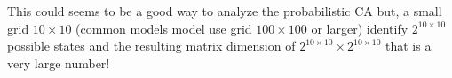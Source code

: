 This could seems to be a good way to analyze the probabilistic CA but, a
small grid  \begin{math}10\times10\end{math} (common models model use grid
\begin{math}100\times100\end{math} or larger) identify
\begin{math}2^{10\times10}\end{math}possible states and the resulting matrix
dimension of \begin{math}2^{10\times10}\times2^{10\times10}\end{math} that is a
very large number!


